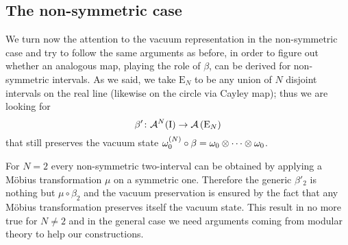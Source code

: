 \subsection{The non-symmetric case}
\label{beta non-symmetric}
We turn now the attention to the vacuum representation in 
the non-symmetric case 
and try to follow the same arguments as before, in 
order to figure out whether an analogous map, 
playing the role of $\beta$, can be derived for 
non-symmetric intervals.
As we said, we take $\textrm{E}_N$ to be any union
of $N$ disjoint intervals on the real line (likewise
on the circle via Cayley map); thus we are looking for 
\begin{equation}
\label{beta_non-sym}
{\beta}'\colon\mathcal{A}^N(\textrm{I})\to\mathcal{A}\left(\textrm{E}_N\right)
\end{equation}
that still preserves the vacuum state
$\omega_0^{(N)}\circ\beta=\omega_0\otimes\cdots\otimes\omega_0$. 

For $N=2$ every non-symmetric two-interval can be 
obtained by applying a M\"obius transformation $\mu$ on a 
symmetric one. Therefore the generic 
$\beta'_2$ is nothing but $\mu\circ\beta_2$ and the vacuum 
preservation is ensured by the fact that any M\"obius 
transformation preserves itself the vacuum state. This 
result in no more true for $N\neq 2$ and in the general 
case we need arguments coming from modular theory to
help our constructions.

